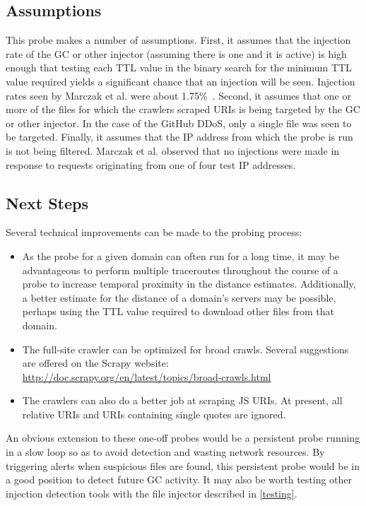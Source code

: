 \subsection{Assumptions}
This probe makes a number of assumptions.
First, it assumes that the injection rate of the GC or other injector (assuming there is one and it is active) is high enough that testing each TTL value in the binary search for the minimum TTL value required yields a significant chance that an injection will be seen.
Injection rates seen by Marczak et al. were about 1.75\%~\cite{Marczak2015}.
Second, it assumes that one or more of the files for which the crawlers scraped URIs is being targeted by the GC or other injector.
In the case of the GitHub DDoS, only a single file was seen to be targeted.
Finally, it assumes that the IP address from which the probe is run is not being filtered.
Marczak et al. observed that no injections were made in response to requests originating from one of four test IP addresses.
\subsection{Next Steps}
Several technical improvements can be made to the probing process:
\begin{itemize}\addtolength{\itemsep}{-.35\baselineskip}
	\item As the probe for a given domain can often run for a long time, it may be advantageous to perform multiple traceroutes throughout the course of a probe to increase temporal proximity in the distance estimates.
		Additionally, a better estimate for the distance of a domain's servers may be possible, perhaps using the TTL value required to download other files from that domain.
	\item The full-site crawler can be optimized for broad crawls.
		Several suggestions are offered on the Scrapy website: \url{http://doc.scrapy.org/en/latest/topics/broad-crawls.html}
	\item The crawlers can also do a better job at scraping JS URIs.
		At present, all relative URIs and URIs containing single quotes are ignored.
\end{itemize}

An obvious extension to these one-off probes would be a persistent probe running in a slow loop so as to avoid detection and wasting network resources.
By triggering alerts when suspicious files are found, this persistent probe would be in a good position to detect future GC activity.
It may also be worth testing other injection detection tools with the file injector described in \autoref{testing}.